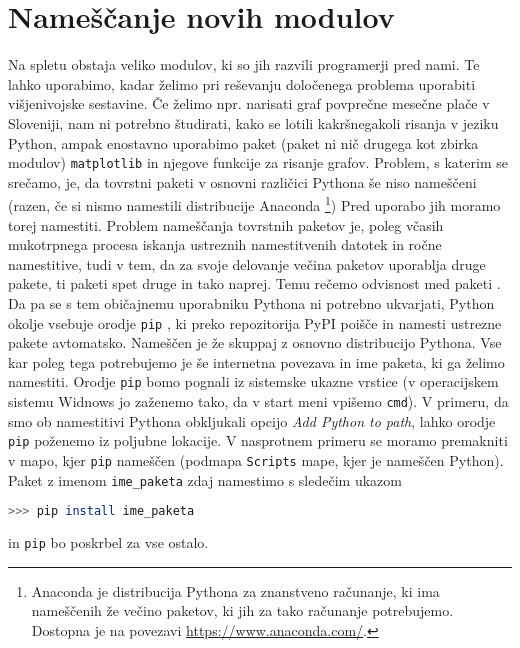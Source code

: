 \section{Nameščanje novih modulov}
Na spletu obstaja veliko modulov, ki so jih razvili programerji pred nami. Te lahko uporabimo, kadar želimo pri reševanju določenega problema uporabiti višjenivojske sestavine. Če želimo npr. narisati graf povprečne mesečne plače v Sloveniji, nam ni potrebno študirati, kako se lotili kakršnegakoli risanja v jeziku Python, ampak enostavno uporabimo paket (paket ni nič drugega kot zbirka modulov) \texttt{matplotlib} in njegove funkcije za risanje grafov. Problem, s katerim se srečamo, je, da tovrstni paketi v osnovni različici Pythona še niso nameščeni (razen, če si nismo namestili distribucije Anaconda \footnote{Anaconda je distribucija Pythona za znanstveno računanje, ki ima nameščenih že večino paketov, ki jih za tako računanje potrebujemo. Dostopna je na povezavi \url{https://www.anaconda.com/}.}) Pred uporabo jih moramo torej namestiti. Problem nameščanja tovrstnih paketov je, poleg včasih mukotrpnega procesa iskanja ustreznih namestitvenih datotek in ročne namestitive, tudi v tem, da za svoje delovanje večina paketov uporablja druge pakete, ti paketi spet druge in tako naprej. Temu rečemo odvisnost med paketi . Da pa se s tem običajnemu uporabniku Pythona ni potrebno ukvarjati, Python okolje vsebuje orodje \texttt{pip} , ki preko repozitorija PyPI  poišče in namesti ustrezne pakete avtomatsko. Nameščen je že skuppaj z osnovno distribucijo Pythona. Vse kar poleg tega potrebujemo je še internetna povezava in ime paketa, ki ga želimo namestiti. Orodje \texttt{pip} bomo pognali iz sistemske ukazne vrstice (v operacijskem sistemu Widnows jo zaženemo tako, da v start meni vpišemo \texttt{cmd}). V primeru, da smo ob namestitivi Pythona obkljukali opcijo \emph{Add Python to path}, lahko orodje \texttt{pip} poženemo iz poljubne lokacije. V nasprotnem primeru se moramo premakniti v mapo, kjer \texttt{pip} nameščen (podmapa \texttt{Scripts} mape, kjer je nameščen Python). Paket z imenom \texttt{ime\_paketa}  zdaj namestimo s sledečim ukazom
\begin{lstlisting}[language=bash]
>>> pip install ime_paketa
\end{lstlisting}
in \texttt{pip} bo poskrbel za vse ostalo.






